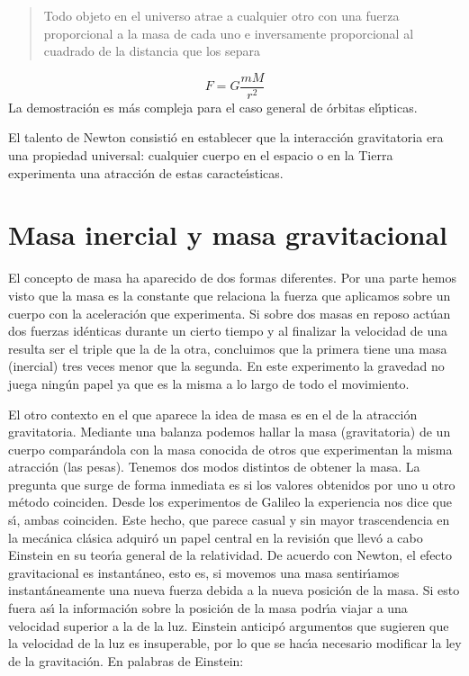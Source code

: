  

\begin{quote}
Todo objeto en el universo atrae a cualquier otro con una fuerza proporcional a la masa de cada uno e inversamente proporcional al cuadrado de la distancia que los separa
\end{quote}
\begin{equation}
F=G\frac{mM}{r^{2}} 
\label{eq:gravitacion_2}
\end{equation}
La demostraci\'on es m\'as compleja para el caso general de \'orbitas el\'\i{}pticas. 

El talento de Newton consisti\'o en establecer que la interacci\'on gravitatoria era una propiedad universal: cualquier cuerpo en el espacio o en la Tierra experimenta una atracci\'on de estas caracte\'\i{}sticas.

\section{Masa inercial y masa gravitacional}
El concepto de masa ha aparecido de dos formas diferentes. Por una parte hemos visto que la masa es la constante que relaciona la fuerza que aplicamos sobre un cuerpo con la aceleraci\'on que experimenta. Si sobre dos masas en reposo act\'uan dos fuerzas id\'enticas durante un cierto tiempo y al finalizar la velocidad de una resulta ser el triple que la de la otra, concluimos que la primera tiene una masa (inercial) tres veces menor que la segunda. En este experimento la gravedad no juega ning\'un papel ya que es la misma a lo largo de todo el movimiento. 

El otro contexto en el que aparece la idea de masa es en el de la atracci\'on gravitatoria. Mediante una balanza podemos hallar la masa (gravitatoria) de un cuerpo compar\'andola con la masa conocida de otros que experimentan la misma atracci\'on (las pesas). Tenemos dos modos distintos de obtener la masa. La pregunta que surge de forma inmediata es si los valores obtenidos por uno u otro m\'etodo coinciden. Desde los experimentos de Galileo la experiencia nos dice que s\'\i{}, ambas coinciden. Este hecho, que parece casual y sin mayor trascendencia en la mec\'anica cl\'asica adquir\'o un papel central en la revisi\'on que llev\'o a cabo Einstein en su teor\'\i{}a general de la relatividad. De acuerdo con Newton, el efecto gravitacional es instant\'aneo, esto es, si movemos una masa sentir\'\i{}amos instant\'aneamente una nueva fuerza debida a la nueva posici\'on de la masa. Si esto fuera as\'\i{} la informaci\'on sobre la posici\'on de la masa podr\'\i{}a viajar a una velocidad superior a la de la luz. Einstein anticip\'o argumentos que sugieren que la velocidad de la luz es insuperable, por lo que se hac\'\i{}a necesario modificar la ley de la gravitaci\'on. En palabras de Einstein:

